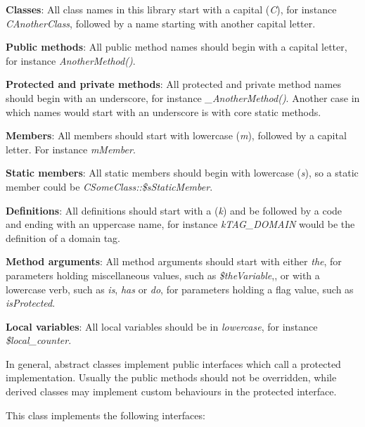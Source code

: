 \begin{DoxyItemize}
\item {\bfseries Classes}\-: All class names in this library start with a capital ({\itshape C\/}), for instance {\itshape C\-Another\-Class\/}, followed by a name starting with another capital letter. 
\item {\bfseries Public methods}\-: All public method names should begin with a capital letter, for instance {\itshape Another\-Method()\/}. 
\item {\bfseries Protected and private methods}\-: All protected and private method names should begin with an underscore, for instance {\itshape \-\_\-\-Another\-Method()\/}. Another case in which names would start with an underscore is with core static methods. 
\item {\bfseries Members}\-: All members should start with lowercase ({\itshape m\/}), followed by a capital letter. For instance {\itshape m\-Member\/}. 
\item {\bfseries Static members}\-: All static members should begin with lowercase ({\itshape s\/}), so a static member could be {\itshape C\-Some\-Class\-::\$s\-Static\-Member\/}. 
\item {\bfseries Definitions}\-: All definitions should start with a ({\itshape k\/}) and be followed by a code and ending with an uppercase name, for instance {\itshape k\-T\-A\-G\-\_\-\-D\-O\-M\-A\-I\-N\/} would be the definition of a domain tag. 
\item {\bfseries Method arguments}\-: All method arguments should start with either {\itshape the\/}, for parameters holding miscellaneous values, such as {\itshape \$the\-Variable\/},, or with a lowercase verb, such as {\itshape is\/}, {\itshape has\/} or {\itshape do\/}, for parameters holding a flag value, such as {\itshape is\-Protected\/}. 
\item {\bfseries Local variables}\-: All local variables should be in {\itshape lowercase\/}, for instance {\itshape \$local\-\_\-counter\/}. 
\end{DoxyItemize}

In general, abstract classes implement public interfaces which call a protected implementation. Usually the public methods should not be overridden, while derived classes may implement custom behaviours in the protected interface.

This class implements the following interfaces\-:



